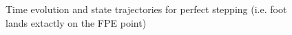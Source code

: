 \begin{figure}[!b]
	\begin{center}
	\end{center}
  	\caption{Time evolution and state trajectories for perfect stepping (i.e. foot lands extactly on the FPE point)}
	\label{sim:perfect}
\end{figure}


